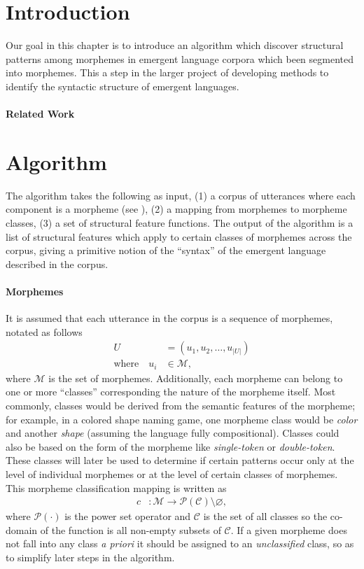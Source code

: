 \section{Introduction}

Our goal in this chapter is to introduce an algorithm which discover structural patterns among morphemes in emergent language corpora which been segmented into morphemes.
This a step in the larger project of developing methods to identify the syntactic structure of emergent languages.


\paragraph{Related Work}
\phantom{}%

\section{Algorithm}

The algorithm takes the following as input,
  (1) a corpus of utterances where each component is a morpheme (see ),
  (2) a mapping from morphemes to morpheme classes,
  (3) a set of structural feature functions.
The output of the algorithm is a list of structural features which apply to certain classes of morphemes across the corpus, giving a primitive notion of the ``syntax'' of the emergent language described in the corpus.


\paragraph{Morphemes}
It is assumed that each utterance in the corpus is a sequence of morphemes, notated as follows
\begin{align}
  U &= (u_1, u_2, \dots, u_{|U|}) \\
  \text{where}\quad u_i &\in \mathcal M
  ,
\end{align}
where $\mathcal M$ is the set of morphemes.
Additionally, each morpheme can belong to one or more ``classes'' corresponding the nature of the morpheme itself.
Most commonly, classes would be derived from the semantic features of the morpheme;
  for example, in a colored shape naming game, one morpheme class would be \emph{color} and another \emph{shape} (assuming the language fully compositional).
Classes could also be based on the form of the morpheme like \emph{single-token} or \emph{double-token}.
These classes will later be used to determine if certain patterns occur only at the level of individual morphemes or at the level of certain classes of morphemes.
This morpheme classification mapping is written as
\begin{align}
  c &: \mathcal M \rightarrow \mathcal P(\mathcal C) \setminus \varnothing
  ,
\end{align}
where $\mathcal P(\cdot)$ is the power set operator and $\mathcal C$ is the set of all classes so the co-domain of the function is all non-empty subsets of $\mathcal C$.
If a given morpheme does not fall into any class \emph{a priori} it should be assigned to an \emph{unclassified} class, so as to simplify later steps in the algorithm.


